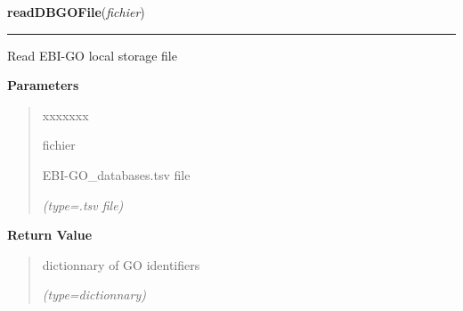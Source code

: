     \label{GoXML:readDBGOFile}

    \vspace{0.5ex}

\hspace{.8\funcindent}\begin{boxedminipage}{\funcwidth}

    \raggedright \textbf{readDBGOFile}(\textit{fichier})

    \vspace{-1.5ex}

    \rule{\textwidth}{0.5\fboxrule}
\setlength{\parskip}{2ex}
    Read EBI-GO local storage file

\setlength{\parskip}{1ex}
      \textbf{Parameters}
      \vspace{-1ex}

      \begin{quote}
        \begin{Ventry}{xxxxxxx}

          \item[fichier]

          EBI-GO\_databases.tsv file

            {\it (type=.tsv file)}

        \end{Ventry}

      \end{quote}

      \textbf{Return Value}
    \vspace{-1ex}

      \begin{quote}
      dictionnary of GO identifiers

      {\it (type=dictionnary)}

      \end{quote}

    \end{boxedminipage}

    \label{GoXML:extractNP}

    \vspace{0.5ex}

